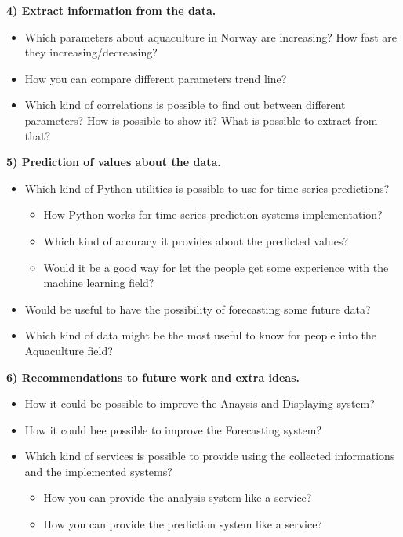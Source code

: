 \newpage

\textbf{4) Extract information from the data.}
\vspace{-5mm}
\begin{itemize}
 \setlength{\itemsep}{-5pt}
  \item Which parameters about aquaculture in Norway are increasing? How fast are they increasing/decreasing? 
  \item How you can compare different parameters trend line?
  \item Which kind of correlations is possible to find out between different parameters? How is possible to show it? What is possible to extract from that?
 \end{itemize}
 
\textbf{5) Prediction of values about the data.}
\vspace{-5mm}
\begin{itemize}
 \setlength{\itemsep}{-5pt} 
  \item Which kind of Python utilities is possible to use for time series predictions?
  		\vspace{-3mm}
		\begin{itemize}
 		\setlength{\itemsep}{-5pt}	
		  \item How Python works for time series prediction systems implementation?
		  \item Which kind of accuracy it provides about the predicted values?
		  \item Would it be a good way for let the people get some experience with the machine learning field? 
		\end{itemize}
  \item Would be useful to have the possibility of forecasting some future data? 
  \item Which kind of data might be the most useful to know for people into the Aquaculture field?
	
 \end{itemize}

\textbf{6) Recommendations to future work and extra ideas.}
\vspace{-5mm}
\begin{itemize}
\setlength{\itemsep}{-5pt}
	\item How it could be possible to improve the Anaysis and Displaying system?
	\item How it could bee possible to improve the Forecasting system?
	\item Which kind of services is possible to provide using the collected informations and the implemented systems?
  		\vspace{-3mm}
		\begin{itemize}
 		\setlength{\itemsep}{-5pt}	
		  	\item How you can provide the analysis system like a service?
		  	\item How you can provide the prediction system like a service?
		\end{itemize}
 \end{itemize}


